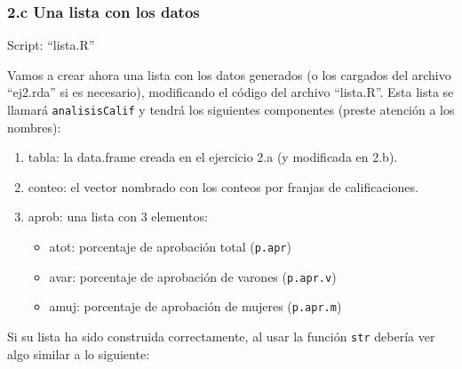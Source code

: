 \documentclass[]{article}
\begin{document}
\subsubsection{2.c Una lista con los datos}

Script: ``lista.R''

Vamos a crear ahora una lista con los datos generados (o los cargados
del archivo ``ej2.rda'' si es necesario), modificando el código del
archivo ``lista.R''. Esta lista se llamará \texttt{analisisCalif} y
tendrá los siguientes componentes (preste atención a los nombres):

\begin{enumerate}[1.]
\item
  tabla: la data.frame creada en el ejercicio 2.a (y modificada en 2.b).
\item
  conteo: el vector nombrado con los conteos por franjas de
  calificaciones.
\item
  aprob: una lista con 3 elementos:
  \begin{itemize}
  \item
    atot: porcentaje de aprobación total (\texttt{p.apr})
  \item
    avar: porcentaje de aprobación de varones (\texttt{p.apr.v})
  \item
    amuj: porcentaje de aprobación de mujeres (\texttt{p.apr.m})
  \end{itemize}
\end{enumerate}
Si su lista ha sido construida correctamente, al usar la función
\texttt{str} debería ver algo similar a lo siguiente:
\end{document}

